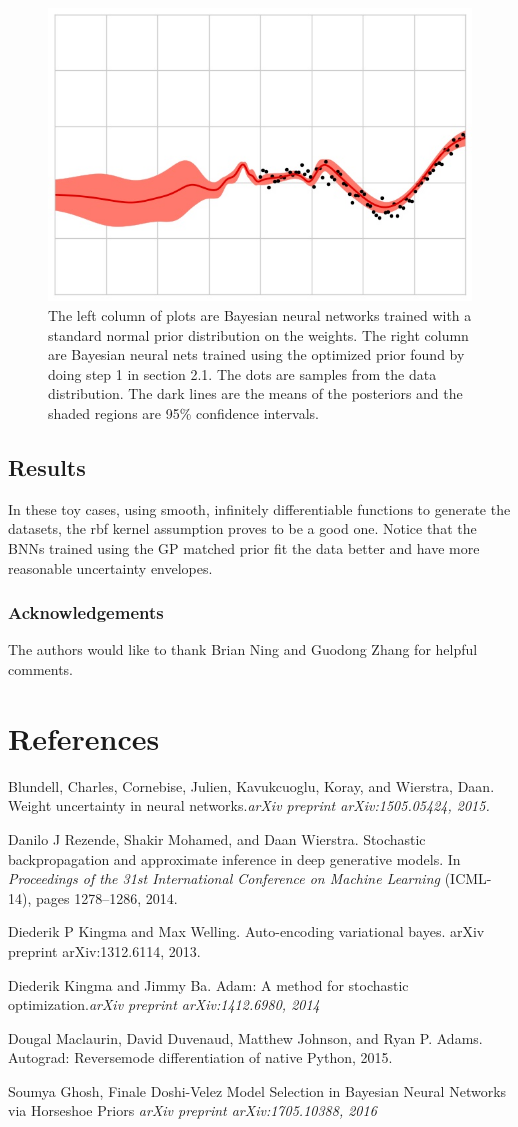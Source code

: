 \documentclass{article}
\begin{document}
\begin{figure}[h]
    \includegraphics[width=.45\textwidth]{figs/red-cube-GPP-BNN-mean-std}
    \caption{The left column of plots are  Bayesian neural networks trained with a standard
             normal prior distribution on the weights. The right column are Bayesian 
             neural nets trained using the optimized prior found by doing step 1 in section 2.1. 
             The dots are samples from the data distribution. 
             The dark lines are the means of the posteriors and the 
             shaded regions are 95\% confidence intervals.}
    \label{fig:my_label}
\end{figure}

\subsection{Results}

In these toy cases, using smooth, infinitely differentiable functions to generate the datasets, the rbf kernel assumption proves to be a good one. Notice that the BNNs trained using the GP matched prior fit the data better and have more reasonable uncertainty envelopes.

\newpage

\subsubsection*{Acknowledgements}

The authors would like to thank Brian Ning and Guodong Zhang for helpful comments.

\section*{References}

Blundell, Charles, Cornebise, Julien, Kavukcuoglu, Koray, and Wierstra, Daan. Weight uncertainty
in neural networks.{\it  arXiv preprint arXiv:1505.05424, 2015. }


Danilo J Rezende, Shakir Mohamed, and Daan Wierstra. Stochastic backpropagation and approximate
inference in deep generative models. In { \it Proceedings of the 31st International Conference on
Machine Learning} (ICML-14), pages 1278–1286, 2014.

Diederik P Kingma and Max Welling. Auto-encoding variational bayes. arXiv preprint
arXiv:1312.6114, 2013.

Diederik Kingma and Jimmy Ba. Adam: A method for stochastic optimization.{\it arXiv preprint
arXiv:1412.6980, 2014}

Dougal Maclaurin, David Duvenaud, Matthew Johnson, and Ryan P. Adams. Autograd: Reversemode
differentiation of native Python, 2015.

Soumya Ghosh, Finale Doshi-Velez Model Selection in Bayesian Neural Networks via Horseshoe Priors
{\it arXiv preprint arXiv:1705.10388, 2016  }
\end{document}
